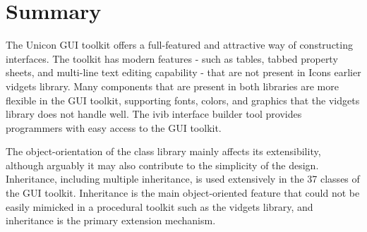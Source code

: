\section*{Summary}

The Unicon GUI toolkit offers a full-featured and attractive way of
constructing interfaces. The toolkit has modern features - such as
tables, tabbed property sheets, and multi-line text editing capability
- that are not present in Icon{\textquotesingle}s earlier vidgets
library. Many components that are present in both libraries are more
flexible in the GUI toolkit, supporting fonts, colors, and graphics
that the vidgets library does not handle well. The ivib interface
builder tool provides programmers with easy access to the GUI toolkit.

The object-orientation of the class library mainly affects its
extensibility, although arguably it may also contribute to the
simplicity of the design. Inheritance, including multiple inheritance,
is used extensively in the 37 classes of the GUI toolkit. Inheritance
is the main object-oriented feature that could not be easily mimicked
in a procedural toolkit such as the vidgets library, and inheritance is
the primary extension mechanism.

\bigskip

